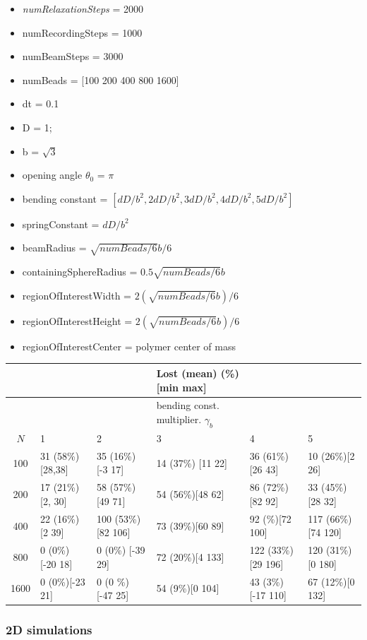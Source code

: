 \documentclass[12pt]{report}
\begin{document}
	  \begin{itemize}
	  	\item \textit{numRelaxationSteps} = 2000
	  	\item numRecordingSteps  = 1000
	  	\item numBeamSteps       = 3000
	  	\item numBeads = [100 200 400 800 1600]
	  	\item dt       = 0.1
	  	\item D        = 1;
	  	\item b        = $\sqrt{3}$
	  	\item opening angle $\theta_0$ = $\pi$
	  	\item bending constant = $[dD/b^2, 2dD/b^2,3dD/b^2,4dD/b^2, 5dD/b^2]$
	  	\item springConstant   = $dD/b^2$
	  	\item beamRadius = $\sqrt{numBeads/6}b/6$
	  	\item containingSphereRadius = $0.5\sqrt{numBeads/6}b$
	  	\item regionOfInterestWidth  = $2(\sqrt{numBeads/6}b)/6$
	  	\item regionOfInterestHeight = $2(\sqrt{numBeads/6}b)/6$
	  	\item regionOfInterestCenter = polymer center of mass
	  \end{itemize}
	  
	 
	  \begin{table}[H]
	  	\tiny{
	  		\begin{tabular}{c| l l l l l}
	  			&           & & Lost (mean) (\%)[min max]& &  \\
	  			\hline
	  			&           & & bending const. multiplier. $\gamma_b$ & &  \\
	  			\hline 
	  			$N$ 	   &            1 & 2 & 3 & 4& 5 \\   	 
	  			\hline 
	  			100 & 31 (58\%) [28,38] & 35 (16\%)[-3 17]    & 14 (37\%) [11 22] & 36 (61\%)[26 43]   & 10 (26\%)[2 26]\\
	  			200 & 17 (21\%) [2, 30] & 58 (57\%)[49 71]    & 54 (56\%)[48 62]  & 86 (72\%) [82 92]  & 33 (45\%)[28 32]\\
	  			400 & 22 (16\%) [2 39]  & 100 (53\%) [82 106] & 73 (39\%)[60 89]  & 92 (\%)[72 100]    & 117 (66\%)[74 120] \\
	  			800 &  0 (0\%) [-20 18] & 0 (0\%) [-39 29]    & 72 (20\%)[4 133]  & 122 (33\%)[29 196] & 120 (31\%)[0 180]\\
	  			1600&  0 (0\%)[-23 21]  & 0 (0 \%) [-47 25]   & 54 (9\%)[0 104]   & 43 (3\%)[-17 110]  & 67 (12\%)[0 132]\\
	  		\end{tabular}
	  	}
	  \end{table}
	\subsubsection{2D simulations}
	
	
	
\end{document}
